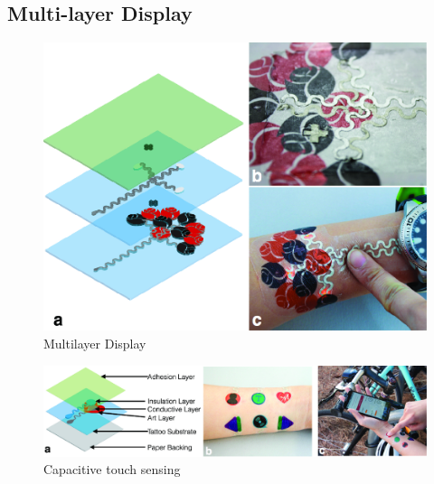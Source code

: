 \documentclass{sigchi}
\begin{document}
\subsection{Multi-layer Display}
\begin{figure}
\centering
\includegraphics[width=1\columnwidth]{figures/Figure7}
\caption{Multilayer Display}
\vspace{-8pt}
\label{fig:multilayer}
\end{figure}
\begin{figure}
\centering
\includegraphics[width=1\textwidth]{figures/Figure8}
\caption{Capacitive touch sensing}
\vspace{-8pt}
\label{fig:capacitive}
\end{figure}
\end{document}
